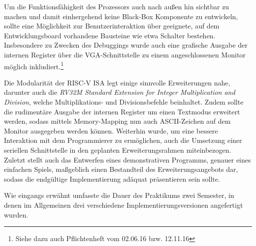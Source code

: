 Um die Funktionsf\"ahigkeit des Prozessors auch nach au{\ss}en hin sichtbar zu machen und damit einhergehend keine Black-Box Komponente zu entwickeln, sollte eine M\"oglichkeit zur Benutzerinteraktion \"uber geeignete, auf dem Entwicklungsboard vorhandene Bausteine wie etwa Schalter bestehen. Insbesondere zu Zwecken des Debuggings wurde auch eine grafische Ausgabe der internen Register \"uber die VGA-Schnittstelle zu einem angeschlossenen Monitor m\"oglich inkludiert.\footnote{Siehe dazu auch Pflichtenheft vom 02.06.16 bzw. 12.11.16}



Die Modularit\"at der RISC-V ISA legt einige sinnvolle Erweiterungen nahe, darunter auch die \textit{RV32M Standard Extension for Integer Multiplication and Division}, welche Multiplikations- und Divisionsbefehle beinhaltet. Zudem sollte die rudiment\"are Ausgabe der internen Register um einen Textmodus erweitert werden, sodass mittels Memory-Mapping nun auch ASCII-Zeichen auf dem Monitor ausgegeben werden k\"onnen. Weiterhin wurde, um eine bessere Interaktion mit dem Programmierer zu erm\"oglichen, auch die Umsetzung einer seriellen Schnittstelle in den geplanten Erweiterungsrahmen miteinbezogen. Zuletzt stellt auch das Entwerfen eines demonstrativen Programms, genauer eines einfachen Spiels, ma\ss{}geblich einen Bestandteil des Erweiterungsangebots dar, sodass die endg\"ultige Implementierung adäquat pr\"asentieren sein sollte.

Wie eingangs erw\"ahnt umfasste die Dauer des Praktikums zwei Semester, in denen im Allgemeinen drei verschiedene Implementierungsversionen angefertigt wurden.

